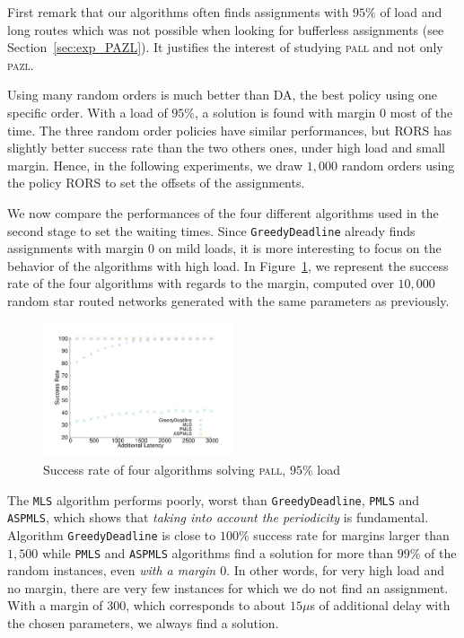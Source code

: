 \documentclass[a4paper,10pt]{article}
\newcommand\greedydeadline{\texttt{GreedyDeadline}\xspace}
\newcommand\MLS{\texttt{MLS}\xspace}
\newcommand\PMLS{\texttt{PMLS}\xspace}
\newcommand\ASPMLS{\texttt{ASPMLS}\xspace}
\newcommand\pazl{\textsc{pazl}\xspace}
\newcommand\pall{\textsc{pall}\xspace}
\begin{document}
  First remark that our algorithms often finds assignments with $95\%$ of load and long routes which was not possible when looking for bufferless assignments (see Section~\ref{sec:exp_PAZL}). It justifies the interest of studying \pall and not only \pazl.
  
     Using many random orders is much better than DA, the best policy using one specific order. 
     With a load of $95\%$, a solution is found with margin $0$ most of the time. The three random order policies have similar performances, but RORS has slightly better success rate than the two others ones, under high load and small margin. Hence, in the following experiments, we draw $1,000$ random orders using the policy RORS to set the offsets of the assignments.
     
      We now compare the performances of the four different algorithms used in the second stage to set the waiting times. Since \greedydeadline already finds assignments with margin $0$ on mild loads, it is more interesting to focus on the behavior of the algorithms with high load. In Figure~\ref{fig:success21000}, we represent the success rate of the four algorithms with regards to the margin,  computed over $10,000$ random star routed networks generated with the same parameters as previously. 
     
    \begin{figure} [h] 
       \begin{center}
      \includegraphics[width=0.5\textwidth]{retour_21000.pdf}
      \end{center}
      \caption{Success rate of four algorithms solving \pall, $95\%$ load}
     \label{fig:success21000}
     \end{figure}
     
      The \MLS algorithm performs poorly, worst than \greedydeadline, \PMLS and \ASPMLS, which shows that \emph{taking into account the periodicity} is fundamental.
     Algorithm \greedydeadline is close to $100\%$ success rate for margins larger than $1,500$ while  \PMLS and \ASPMLS algorithms find a solution for more than $99\%$ of the random instances, even \emph{with a margin $0$}. In other words, for very high load and no margin, there are very few instances for which we do not find an assignment. With a margin of $300$, which corresponds to about $15\mu$s of additional delay with the chosen parameters, we always find a solution. 
     
\end{document}
